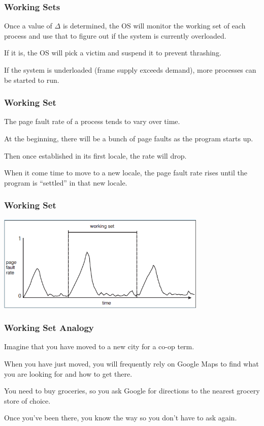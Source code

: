 \begin{frame}
\frametitle{Working Sets}

Once a value of $\Delta$ is determined, the OS will monitor the working set of each process and use that to figure out if the system is currently overloaded. 

If it is, the OS will pick a victim and suspend it to prevent thrashing. 

If the system is underloaded (frame supply exceeds demand), more processes can be started to run.


\end{frame}

\begin{frame}
\frametitle{Working Set}

The page fault rate of a process tends to vary over time. 

At the beginning, there will be a bunch of page faults as the program starts up. 

Then once established in its first locale, the rate will drop. 

When it come time to move to a new locale, the page fault rate rises until the program is ``settled'' in that new locale.


\end{frame}

\begin{frame}
\frametitle{Working Set}

\begin{center}
	\includegraphics[width=0.75\textwidth]{images/workingset.png}
\end{center}


\end{frame}

\begin{frame}
\frametitle{Working Set Analogy}

Imagine that you have moved to a new city for a co-op term. 

When you have just moved, you will frequently rely on Google Maps to find what you are looking for and how to get there. 

You need to buy groceries, so you ask Google for directions to the nearest grocery store of choice. 

Once you've been there, you know the way so you don't have to ask again. 


\end{frame}

